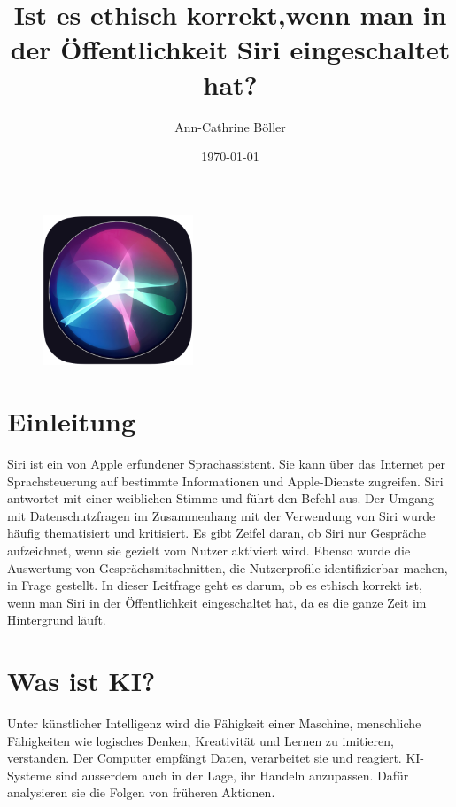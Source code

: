 \documentclass{article}
\title{Ist es ethisch korrekt,wenn man in der Öffentlichkeit Siri eingeschaltet hat?}
\author{Ann-Cathrine Böller}
\date{\today}
\begin{document}
\maketitle

\begin{figure}[ht]
    \centering
    \includegraphics[width=0.4\textwidth]{siri.jpg}
    \label{fig:siri}
    \end{figure}




\tableofcontents

\section{Einleitung}

Siri ist ein von Apple erfundener Sprachassistent. Sie kann über das Internet per Sprachsteuerung auf bestimmte Informationen und Apple-Dienste zugreifen. Siri antwortet mit einer weiblichen Stimme und führt den Befehl aus. Der Umgang mit Datenschutzfragen im Zusammenhang mit der Verwendung von Siri wurde häufig thematisiert und kritisiert. Es gibt Zeifel daran, ob Siri nur Gespräche aufzeichnet, wenn sie gezielt vom Nutzer aktiviert wird. Ebenso wurde die Auswertung von Gesprächsmitschnitten, die Nutzerprofile identifizierbar machen, in Frage gestellt. In dieser Leitfrage geht es darum, ob es ethisch korrekt ist, wenn man Siri in der Öffentlichkeit eingeschaltet hat, da es die ganze Zeit im Hintergrund läuft.




\section{Was ist KI?}
Unter künstlicher Intelligenz wird die Fähigkeit einer Maschine, menschliche Fähigkeiten wie logisches Denken, Kreativität und Lernen zu imitieren, verstanden.
Der Computer empfängt Daten, verarbeitet sie und reagiert. KI-Systeme sind ausserdem auch in der Lage, ihr Handeln anzupassen. Dafür analysieren sie die Folgen von früheren Aktionen.
\end{document}

